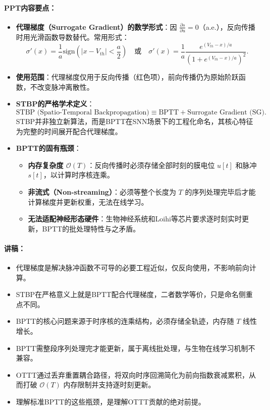 \documentclass[journal,12pt,onecolumn]{IEEEtran}
\begin{document}
\paragraph{\textbf{PPT内容要点：}}
\begin{itemize}
    \item \textbf{代理梯度（Surrogate Gradient）的数学形式}：因 \(\frac{\partial s}{\partial u} = 0\)（a.e.），反向传播时用光滑函数导数替代。常用形式：
    \[
    \sigma'(x) = \frac{1}{a}\text{sign}\left(|x - V_{th}| < \frac{a}{2}\right) \quad \text{或} \quad \sigma'(x) = \frac{1}{a}\frac{e^{(V_{th}-x)/a}}{(1+e^{(V_{th}-x)/a})^2}.
    \]
    \item \textbf{使用范围}：代理梯度仅用于反向传播（红色项），前向传播仍为原始阶跃函数，不改变脉冲离散性。
    \item \textbf{STBP的严格学术定义}：
    \[
    \text{STBP (Spatio-Temporal Backpropagation)} \equiv \text{BPTT} + \text{Surrogate Gradient (SG)}.
    \]
    STBP并非独立新算法，而是BPTT在SNN场景下的工程化命名，其核心特征为完整的时间展开配合代理梯度。
    \item \textbf{BPTT的固有瓶颈}：
    \begin{itemize}
        \item \textbf{内存复杂度 \(\mathcal{O}(T)\)}：反向传播时必须存储全部时刻的膜电位 \(u[t]\) 和脉冲 \(s[t]\)，以计算时序核连乘。
        \item \textbf{非流式（Non-streaming）}：必须等整个长度为 \(T\) 的序列处理完毕后才能计算梯度并更新权重，无法在线学习。
        \item \textbf{无法适配神经形态硬件}：生物神经系统和Loihi等芯片要求逐时刻实时更新，BPTT的批处理特性与之矛盾。
    \end{itemize}
\end{itemize}

\paragraph{\textbf{讲稿：}}
\begin{itemize}
    \item 代理梯度是解决脉冲函数不可导的必要工程近似，仅反向使用，不影响前向计算。
    \item STBP在严格意义上就是BPTT配合代理梯度，二者数学等价，只是命名侧重点不同。
    \item BPTT的核心问题来源于时序核的连乘结构，必须存储全轨迹，内存随 \(T\) 线性增长。
    \item BPTT需整段序列处理完才能更新，属于离线批处理，与生物在线学习机制不兼容。
    \item OTTT通过丢弃重置耦合路径，将双向时序回溯简化为前向指数衰减累积，从而打破 \(\mathcal{O}(T)\) 内存限制并支持逐时刻更新。
    \item 理解标准BPTT的这些瓶颈，是理解OTTT贡献的绝对前提。
\end{itemize}
\end{document}
